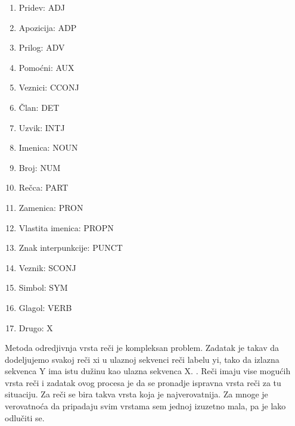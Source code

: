 \documentclass[12pt,oneside]{memoir}
\begin{document}
\begin{enumerate}
\item Pridev: ADJ
\item Apozicija: ADP
\item Prilog: ADV
\item Pomoćni: AUX
\item Veznici: CCONJ
\item Član: DET
\item Uzvik: INTJ
\item Imenica: NOUN
\item Broj: NUM
\item Rečca: PART
\item Zamenica: PRON
\item Vlastita imenica: PROPN
\item Znak interpunkcije: PUNCT
\item Veznik: SCONJ
\item Simbol: SYM
\item Glagol: VERB
\item Drugo: X
\end{enumerate}

Metoda odredjivnja vrsta reči je kompleksan problem.  Zadatak je takav da dodeljujemo svakoj reči xi u ulaznoj sekvenci reči labelu yi,  tako da izlazna sekvenca Y ima istu dužinu kao ulazna sekvenca X.  \cite{pos_tagging}. Reči imaju vise mogućih vrsta reči i zadatak ovog procesa je da se pronadje ispravna vrsta reči za tu situaciju.  Za reči se bira takva vrsta koja je najverovatnija.  Za mnoge je verovatnoća da pripadaju svim vrstama sem jednoj izuzetno mala,  pa je lako odlučiti se.  
\end{document}
